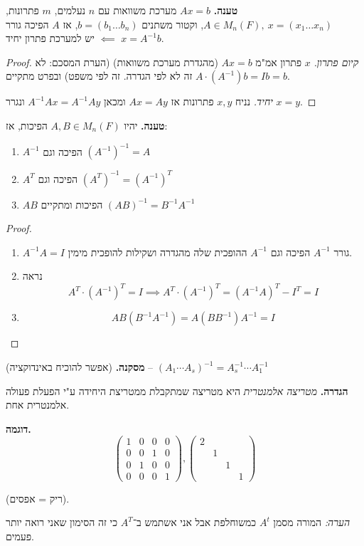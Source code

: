 \documentclass[]{article}
\newcommand\pms[1]    {\begin{pmatrix}
		#1
\end{pmatrix}}
\newcommand\op    {^{-1}}
\begin{document}
	\textbf{טענה. }$Ax = b$ מערכת משוואות עם $n$ נעלמים, $m$ פתרונות, $A \in M_n(F), \ x = (x_1 \dots x_n)$, וקטור משתנים $b = (b_1 \dots b_n)$, אז $A$ הפיכה גורר $x = A\op b$ $\impliedby$ יש למערכת פתרון יחיד. 
	
	\begin{proof}
		\textit{קיום פתרון. }$x$ פתרון אמ"מ $Ax = b$ (מהגדרת מערכת משוואות) (הערת המסכם: לא זה לא לפי הגדרה. זה לפי משפט) ובפרט מתקיים $A \cdot (A\op)b = Ib = b$. 
		
		\textit{יחיד. }נניח $x, y$ פתרונות אז $Ax = Ay$ ומכאן $A\op Ax = A\op Ay$ ונגרר $x = y$. 
	\end{proof}
	
	\textbf{טענה. }יהיו $A, B \in M_n(F)$ הפיכות, אז: 
	\begin{enumerate}
		\item $A\op$ הפיכה וגם $(A\op)\op = A$
		\item $A^T$ הפיכה וגם $(A^T)\op = (A\op)^T$
		\item $AB$ הפיכות ומתקיים $(AB)\op = B\op A\op$
	\end{enumerate}
	
	\begin{proof}
		\begin{enumerate}
			\item $A\op A = I$ גורר $A\op$ הפיכה וגם $A\op$ ההופכית שלה מהגדרה ושקילות להופכית מימין. 
			\item נראה
			\[ A^T \cdot (A\op)^T = I \implies A^T \cdot (A\op)^T = (A\op A)^T - I^T = I \]
			\item 
			\[ AB(B\op A\op) = A(BB\op)A\op = I \]
		\end{enumerate}
	\end{proof}
	
	\textbf{מסקנה. }(אפשר להוכיח באינדוקציה) – $(A_1 \cdots A_s)\op = A_s\op \cdots A_1\op$
	
	\textbf{הגדרה. }\textit{מטריצה אלמנטרית} היא מטריצה שמתקבלת ממטריצת היחידה ע"י הפעלת פעולה אלמנטרית אחת. 
	
	\textbf{דוגמה. }
	\[ \pms{1 & 0 & 0 & 0 \\ 0 & 0 & 1 & 0 \\ 0 & 1 & 0 & 0 \\ 0 & 0 & 0 & 1}, \pms{2 \\ & 1 \\  && 1 \\ &&& 1} \]
	
	(ריק = אפסים). 
	
	\textit{הערה: }המורה מסמן $A^t$ כמשוחלפת אבל אני אשתמש ב־$A^T$ כי זה הסימון שאני רואה יותר פעמים. 
	
\end{document}
